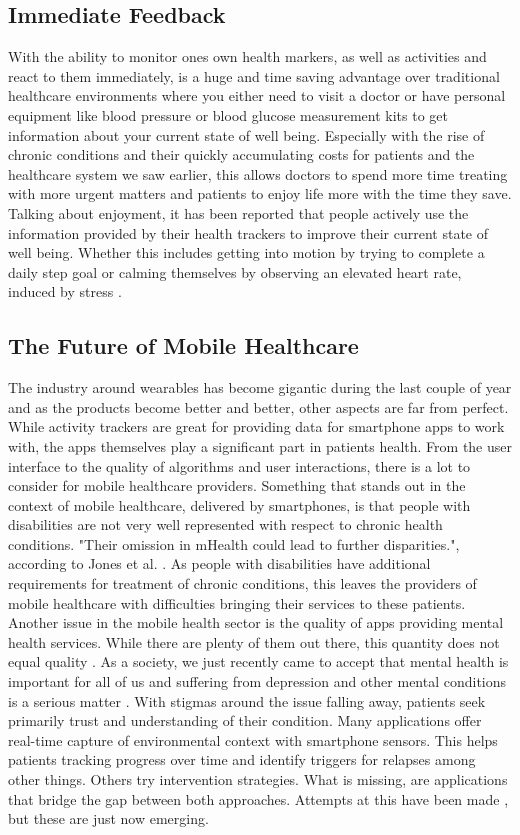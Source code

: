 \subsection{Immediate Feedback}
With the ability to monitor ones own health markers, as well as activities and react to them immediately, is a huge and time saving advantage over traditional healthcare environments where you either need to visit a doctor or have personal equipment like blood pressure or blood glucose measurement kits to get information about your current state of well being. Especially with the rise of chronic conditions and their quickly accumulating costs for patients and the healthcare system we saw earlier, this allows doctors to spend more time treating with more urgent matters and patients to enjoy life more with the time they save. Talking about enjoyment, it has been reported that people actively use the information provided by their health trackers to improve their current state of well being. Whether this includes getting into motion by trying to complete a daily step goal \cite{rasche2015activity} or calming themselves by observing an elevated heart rate, induced by stress \cite{mayya2015continuous}.
\subsection{The Future of Mobile Healthcare}
The industry around wearables has become gigantic during the last couple of year \cite{wearableMarket} and as the products become better and better, other aspects are far from perfect.
While activity trackers are great for providing data for smartphone apps to work with, the apps themselves play a significant part in patients health. From the user interface to the quality of algorithms and user interactions, there is a lot to consider for mobile healthcare providers. Something that stands out in the context of mobile healthcare, delivered by smartphones, is that people with disabilities are not very well represented with respect to chronic health conditions. "Their omission in mHealth could lead to further disparities.", according to Jones et al. \cite{jones2018mobile}. As people with disabilities have additional requirements for treatment of chronic conditions, this leaves the providers of mobile healthcare with difficulties bringing their services to these patients. \\
Another issue in the mobile health sector is the quality of apps providing mental health services. While there are plenty of them out there, this quantity does not equal quality \cite{torous2017needed}. As a society, we just recently came to accept that mental health is important for all of us and suffering from depression and other mental conditions is a serious matter \cite{bharadwaj2017mental}. With stigmas around the issue falling away, patients seek primarily trust and understanding of their condition. Many applications offer real-time capture of environmental context with smartphone sensors. This helps patients tracking progress over time and identify triggers for relapses among other things. Others try intervention strategies. What is missing, are applications that bridge the gap between both approaches. Attempts at this have been made \cite{torous2019creating}, but these are just now emerging.
